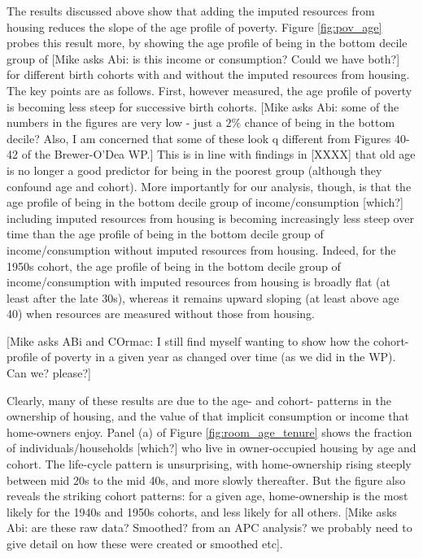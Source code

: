 The results discussed above show that adding the imputed resources from housing reduces the slope of the age profile of poverty.  Figure \ref{fig:pov_age} probes this result more, by showing the age profile of being in the bottom decile group of [Mike asks Abi: is this income or consumption? Could we have both?] for different birth cohorts with and without the imputed resources from housing. The key points are as follows. First, however measured, the age profile of poverty is becoming less steep for successive birth cohorts. [Mike asks Abi: some of the numbers in the figures are very low - just a $2\%$ chance of being in the bottom decile? Also, I am concerned that some of these look q different from Figures 40-42 of the Brewer-O'Dea WP.] This is in line with findings in [XXXX] that old age is no longer a good predictor for being in the poorest group (although they confound age and cohort). More importantly for our analysis, though, is that the age profile of being in the bottom decile group of income/consumption [which?] including imputed resources from housing is becoming increasingly less steep over time than the age profile of being in the bottom decile group of income/consumption without imputed resources from housing. Indeed, for the 1950s cohort, the age profile  of being in the bottom decile group of income/consumption with imputed resources from housing is broadly flat (at least after the late 30s), whereas it remains upward sloping (at least above age 40) when resources are measured without those from housing.

[Mike asks ABi and COrmac: I still find myself wanting to show how the cohort-profile of poverty in a given year as changed over time (as we did in the WP). Can we? please?]

Clearly, many of these results are due to the age- and cohort- patterns in the ownership of housing, and the value of that implicit consumption or income that home-owners enjoy. Panel (a) of Figure \ref{fig:room_age_tenure} shows the fraction of individuals/households [which?] who live in owner-occupied housing by age and cohort. The life-cycle pattern is unsurprising, with home-ownership rising steeply between mid 20s to the mid 40s, and more slowly thereafter. But the figure also reveals the striking cohort patterns: for a given age, home-ownership is the most likely for the 1940s and 1950s cohorts, and less likely for all others.  [Mike asks Abi: are these raw data? Smoothed? from an APC analysis? we probably need to give detail on how these were created or smoothed etc].

